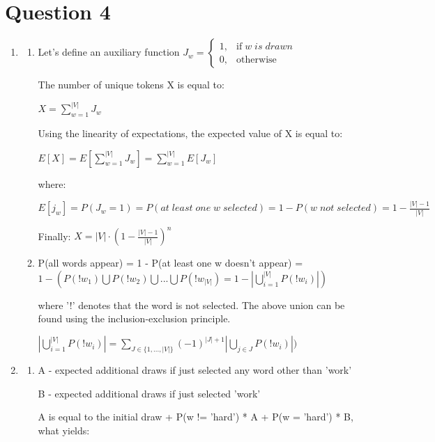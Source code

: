\documentclass{article}
\begin{document}
\section*{Question 4} 
\begin{enumerate}[label = (\alph*)]
    \item
    \begin{enumerate}[label = (\roman*)]
    \item
    Let's define an auxiliary function $J_w = \begin{cases}
      1, & \text{if} \; w \; is \; drawn \\
      0, & \text{otherwise}
    \end{cases}$
    
    The number of unique tokens X is equal to:
    
    $X = \sum_{w=1}^{|V|} J_w$
    
    Using the linearity of expectations, the expected value of X is equal to:
    
    $E[X] = E[\sum_{w=1}^{|V|} J_w] = \sum_{w=1}^{|V|} E[J_w]$
    
    where:
    
    $E[j_w] = P(J_w = 1) = P(at \;least\; one\; w \;selected) = 1 - P(w \; not \; selected) = 1- \frac{|V|-1}{|V|}$
    
    Finally: $X = |V| \cdot (1 - \frac{|V|-1}{|V|})^n$
    
    \item
    P(all words appear) = 1 - P(at least one w doesn't appear) = $1 - (P(!w_1) \bigcup P(!w_2) \bigcup ... \bigcup P(!w_|V|) = 1 - |\bigcup_{i=1}^{|V|}P(!w_i)|)$ 
    
    where '!' denotes that the word is not selected. 
    The above union can be found using the inclusion-exclusion principle. 
    
    $|\bigcup_{i=1}^{|V|}P(!w_i)| = \sum_{J \in \{1,...,|V|\}} (-1)^{|J|+1}|\bigcup_{j \in J}P(!w_i)|) $
    
	\end{enumerate}
	
	\item
    \begin{enumerate}[label = (\roman*)]
    \item
    A - expected additional draws if just selected any word other than 'work'
    
    B - expected additional draws if just selected 'work'

	A is equal to the initial draw + P(w != 'hard') * A + P(w = 'hard') * B, what yields:
	

\end{enumerate}
\end{enumerate}
\end{document}
